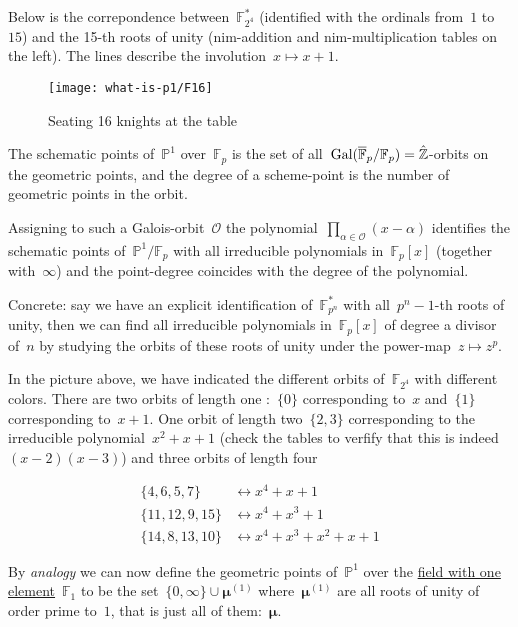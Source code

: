 Below is the correpondence between~$\mathbb{F}_{2^4}^{\ast}$ (identified with the ordinals from~$1$ to~$15$) and the 15-th roots of unity (nim-addition and nim-multiplication tables on the left). The lines describe the involution~$x \mapsto x+1$.

\begin{figure}[ht]
  \centering
  \texttt{[image: what-is-p1/F16]}
  \caption{Seating 16 knights at the table}
  \label{figure:f16}
\end{figure}

The schematic points of~$\mathbb{P}^1$ over~$\mathbb{F}_p$ is the set of all~$\operatorname{Gal}(\overline{\mathbb{F}}_p/\mathbb{F}_p) = \hat{\mathbb{Z}}$-orbits on the geometric points, and the degree of a scheme-point is the number of geometric points in the orbit.

Assigning to such a Galois-orbit~$\mathcal{O}$ the polynomial~$\prod_{\alpha \in \mathcal{O}} (x-\alpha)$ identifies the schematic points of~$\mathbb{P}^1/\mathbb{F}_p$ with all irreducible polynomials in~$\mathbb{F}_p[x]$ (together with~$\infty$) and the point-degree coincides with the degree of the polynomial.

Concrete: say we have an explicit identification of~$\mathbb{F}_{p^n}^{\ast}$ with all~$p^n-1$-th roots of unity, then we can find all irreducible polynomials in~$\mathbb{F}_p[x]$ of degree a divisor of~$n$ by studying the orbits of these roots of unity under the power-map~$z \mapsto z^p$.

In the picture above, we have indicated the different orbits of~$\mathbb{F}_{2^4}$ with different colors. There are two orbits of length one :~$\{ 0 \}$ corresponding to~$x$ and~$\{ 1 \}$ corresponding to~$x+1$. One orbit of length two~$\{ 2,3 \}$ corresponding to the irreducible polynomial~$x^2+x+1$ (check the tables to verfify that this is indeed~$(x-2)(x-3)$) and three orbits of length four

\begin{equation}
  \begin{aligned}
    \{ 4,6,5,7 \} &\leftrightarrow x^4+x+1 \\
    \{ 11,12,9,15 \} &\leftrightarrow x^4+x^3+1 \\
    \{ 14,8,13,10 \} &\leftrightarrow x^4+x^3+x^2+x+1
  \end{aligned}
\end{equation}

By \emph{analogy} we can now define the geometric points of~$\mathbb{P}^1$ over the \href{http://en.wikipedia.org/wiki/Field_with_one_element}{field with one element}~$\mathbb{F}_1$ to be the set~$\{ 0,\infty \} \cup \pmb{\mu}^{(1)}$ where~$\pmb{\mu}^{(1)}$ are all roots of unity of order prime to~$1$, that is just all of them:~$\pmb{\mu}$.

